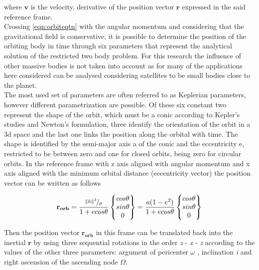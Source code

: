 where $\mathbf{v}$ is the velocity, derivative of the position vector $\mathbf{r}$ expressed in the said reference frame.\\
Crossing \ref{eqn:orbiteqtn} with the angular momentum and considering that the gravitational field is conservative, it is possible to determine the position of the orbiting body in time through six parameters that represent the analytical solution of the restricted two body problem. For this research the influence of other massive bodies is not taken into account as for many of the applications here considered can be analysed considering satellites to be small bodies close to the planet.\\
The most used set of parameters are often referred to as Keplerian parameters, however different parametrization are possible. Of these six constant two represent the shape of the orbit, which must be a conic according to Kepler's studies and Newton's formulation, three identify the orientation of the orbit in a \acrshort{3d} space and the last one links the position along the orbital with time. The shape is identified by the semi-major axis a of the conic and the eccentricity e, restricted to be between zero and one for closed orbits, being zero for circular orbits. In the reference frame with z axis aligned with angular momentum and x axis aligned with the minimum orbital distance (eccentricity vector) the position vector can be written as follows

\begin{equation}
  \mathbf{r_{orb}} = \frac{\nicefrac{\left\lVert h\right\rVert^2}{\mu}}{1 + e cos \theta} \begin{Bmatrix} cos \theta
    \\ sin \theta
    \\ 0
  \end{Bmatrix} = \frac{a(1-e^2)}{1+ e cos \theta} \begin{Bmatrix} cos \theta
    \\ sin \theta
    \\ 0
  \end{Bmatrix}
\end{equation}

Then the position vector $\mathbf{r_{orb}}$ in this frame can be translated back into the inertial $\mathbf{r}$ by using three sequential rotations in the order \textit{z} - \textit{x} - \textit{z} according to the values of the other three parameters: argument of pericenter $\omega$ , inclination \textit{i} and right ascension of the ascending node $\Omega$.


